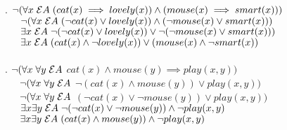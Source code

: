 \documentclass{article}
\begin{document}
    . $\neg(\forall x \hspace{0.1cm} \mathcal{E} A  \hspace{0.1cm} (cat(x) \implies lovely(x)) \land (mouse(x) \implies smart(x)))   $ \\
    $\indent \neg(\forall x \hspace{0.1cm} \mathcal{E} A  \hspace{0.1cm} (\neg cat(x) \lor lovely(x)) \land (\neg mouse(x) \lor smart(x)))$\\
    $\indent \exists x  \hspace{0.1cm}  \mathcal{E} A  \hspace{0.1cm} \neg (\neg cat(x) \lor lovely(x)) \lor \neg (\neg mouse(x) \lor smart(x)))$ \\
    $\indent \exists x  \hspace{0.1cm} \mathcal{E} A  \hspace{0.1cm} (cat(x) \land \neg lovely(x)) \lor (mouse(x) \land \neg smart(x))$ \\ \\
    
    . $\neg(\forall x \hspace{0.1cm} \forall y \hspace{0.1cm} \mathcal{E} A$
    $cat(x) \land mouse(y) \implies {play(x,y))}$ \\
    $\indent\neg(\forall x \hspace{0.1cm} \forall y \hspace{0.1cm} \mathcal{E} A$
    $\neg(cat(x) \land mouse(y)) \lor play(x,y))$ \\
    $\indent\neg(\forall x \hspace{0.1cm} \forall y \hspace{0.1cm} \mathcal{E} A$
    $(\neg cat(x) \lor \neg mouse(y)) \lor play(x,y))$ \\
    $\indent \exists x \exists y  \hspace{0.1cm} \mathcal{E} A  \hspace{0.1cm} \neg (\neg cat(x) \lor \neg mouse(y)) \land \neg play(x,y)$ \\
    $\indent \exists x \exists y  \hspace{0.1cm} \mathcal{E} A  \hspace{0.1cm} (cat(x) \land mouse(y)) \land \neg play(x,y)$ \\
  

    \newpage
\end{document}
